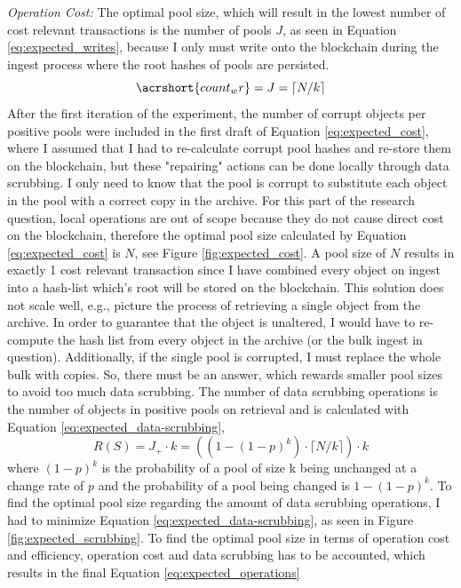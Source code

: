 \documentclass[final]{vutinfth}
\begin{document}
\textit{Operation Cost:} The optimal pool size, which will result in the lowest number of cost relevant transactions is the number of pools $J$, as seen in Equation \ref{eq:expected_writes}, because I only must write onto the blockchain during the ingest process where the root hashes of pools are persisted.
\begin{equation}\label{eq:expected_writes}
    \acrshort{count_wr} = J = \lceil N/k \rceil
\end{equation}
After the first iteration of the experiment, the number of corrupt objects per positive pools were included in the first draft of Equation \ref{eq:expected_cost}, where I assumed that I had to re-calculate corrupt pool hashes and re-store them on the blockchain, but these "repairing" actions can be done locally through data scrubbing. I only need to know that the pool is corrupt to substitute each object in the pool with a correct copy in the archive. For this part of the research question, local operations are out of scope because they do not cause direct cost on the blockchain, therefore the optimal pool size calculated by Equation \ref{eq:expected_cost} is $N$, see Figure \ref{fig:expected_cost}. A pool size of $N$ results in exactly 1 cost relevant transaction since I have combined every object on ingest into a hash-list which's root will be stored on the blockchain. This solution does not scale well, e.g., picture the process of retrieving a single object from the archive. In order to guarantee that the object is unaltered, I would have to re-compute the hash list from every object in the archive (or the bulk ingest in question). Additionally, if the single pool is corrupted, I must replace the whole bulk with copies. 
So, there must be an answer, which rewards smaller pool sizes to avoid too much data scrubbing. The number of data scrubbing operations is the number of objects in positive pools on retrieval and is calculated with Equation \ref{eq:expected_data-scrubbing},
\begin{equation}\label{eq:expected_data-scrubbing}
    R(S) = J_+ \cdot k = ((1-(1-p)^k)\cdot \lceil N/k \rceil) \cdot k
\end{equation}
where $(1-p)^k$ is the probability of a pool of size k being unchanged at a change rate of $p$ and the probability of a pool being changed is $1-(1-p)^k$. To find the optimal pool size regarding the amount of data scrubbing operations, I had to minimize Equation \ref{eq:expected_data-scrubbing}, as seen in Figure \ref{fig:expected_scrubbing}.
To find the optimal pool size in terms of operation cost and efficiency, operation cost and data scrubbing has to be accounted, which results in the final Equation \ref{eq:expected_operations}
\end{document}

